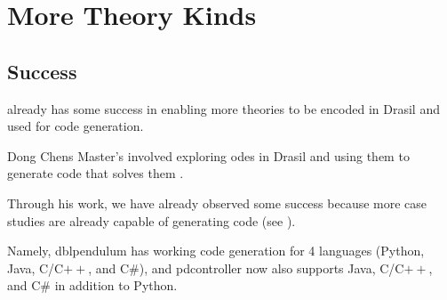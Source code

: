 \chapter{More Theory Kinds}
\label{chap:more-theory-kinds}









\section{Success}
\label{chap:more-theory-kinds:sec:success}

\ModelKind{} already has some success in enabling more theories to be encoded in
Drasil and used for code generation.

Dong Chens Master's involved exploring \acsp{ode} in Drasil and using them to
generate code that solves them \cite{Chen2022MEng}.

Through his work, we have already observed some success because more case
studies are already capable of generating code (see
).

Namely, \acs{dblpendulum} has working code generation for 4 languages (Python,
Java, C/C\(++\), and C\#), and \acs{pdcontroller} now also supports Java,
C/C\(++\), and C\# in addition to Python.

\caseStudiesCodeTableAfterDongsWork{}


